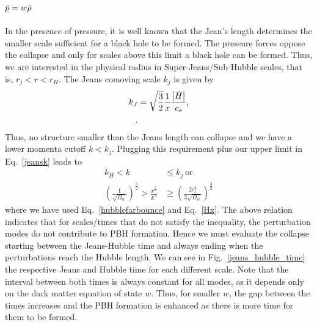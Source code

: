 \documentclass[a4paper,11pt]{article}
\begin{document}
\subsection{$\Bar{p} = w \bar{\rho}$}

In the presence of pressure, it is well known that the Jean's length determines the
smaller scale sufficient for a black hole to be formed. The pressure forces oppose the
collapse and only for scales above this limit a black hole can be formed. Thus, we are
interested in the physical radius in Super-Jeans/Sub-Hubble scales, that is,
$r_j<r<r_H$. The Jeans comoving scale $k_j$ is given by~\cite{Quintin2016}
\begin{align}
	\label{jeansk}
	k_J & = \sqrt{\frac{3}{2}}\frac{1}{x} \frac{\abs{\Bar{H}}}{c_s}, \\
	.\end{align}
Thus, no structure smaller than the Jeans length can collapse and we have a lower
momenta cutoff $k<k_j$. Plugging this requirement plus our upper limit in
Eq.~\eqref{jeansk} leads to
\begin{align}
	\label{jeanslimit}
	k_H<k                                                                            & \leq k_j~\text{or}\nonumber                                     \\
	\left(\frac{1}{\sqrt{\Omega_w}}\right)^{\frac{3}{2}}>\frac{x^{\frac{2}{3}}}{k^3} & \geq \left(\frac{2c_s^2}{3\sqrt{\Omega_w}}\right)^{\frac{3}{2}}
\end{align}
where we have used Eq.~\eqref{hubblefarbounce} and Eq.~\eqref{Hx}. The above relation
indicates that for scales/times that do not satisfy the inequality, the perturbation
modes do not contribute to PBH formation. Hence we must evaluate the collapse starting
between the Jeans-Hubble time and always ending when the perturbations reach the Hubble
length. We can see in Fig.~\ref{jeans_hubble_time} the respective Jeans and Hubble time
for each different scale. Note that the interval between both times is always constant
for all modes, as it depends only on the dark matter equation of state $w$. Thus, for
smaller $w$, the gap between the times increases and the PBH formation is enhanced as
there is more time for them to be formed.
\end{document}
